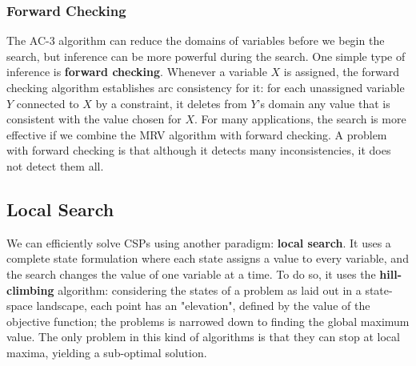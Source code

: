 \documentclass{article}
\begin{document}
\subsubsection{Forward Checking}
The AC-3 algorithm can reduce the domains of variables before we begin the search, but inference can be more powerful during the search. One simple type of inference is \textbf{forward checking}. Whenever a variable \(X\) is assigned, the forward checking algorithm establishes arc consistency for it: for each unassigned variable \(Y\) connected to \(X\) by a constraint, it deletes from \(Y\)'s domain any value that is consistent with the value chosen for \(X\). For many applications, the search is more effective if we combine the MRV algorithm with forward checking. A problem with forward checking is that although it detects many inconsistencies, it does not detect them all.

\subsection{Local Search}
We can efficiently solve CSPs using another paradigm: \textbf{local search}. It uses a complete state formulation where each state assigns a value to every variable, and the search changes the value of one variable at a time. To do so, it uses the \textbf{hill-climbing} algorithm: considering the states of a problem as laid out in a state-space landscape, each point has an "elevation", defined by the value of the objective function; the problems is narrowed down to finding the global maximum value. The only problem in this kind of algorithms is that they can stop at local maxima, yielding a sub-optimal solution.
\end{document}
